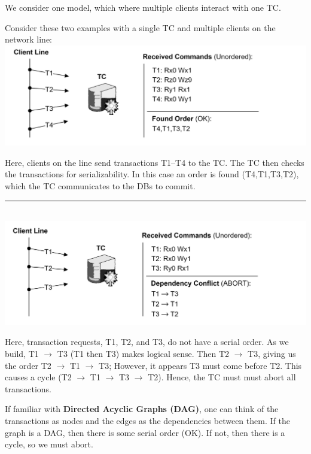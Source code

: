     \newpage 

    \noindent
    We consider one model, which where multiple clients interact with one TC.
    \begin{Example}

        Consider these two examples with a single TC and multiple clients on the network line:\\

       \noindent
        \includegraphics[width=\textwidth]{Sections/trans/central_1.png}
           
        \noindent
        Here, clients on the line send transactions T1--T4 to the TC. The TC then checks the transactions for serializability.
        In this case an order is found (T4,T1,T3,T2), which the TC communicates to the DBs to commit.\\

        \noindent
        \rule{\textwidth}{0.4pt}\\

        \noindent
        \includegraphics[width=\textwidth]{Sections/trans/central_2.png}

        \noindent
        Here, transaction requests, T1, T2, and T3, do not have a serial order.
        As we build, T1 $\to$ T3 (T1 then T3) makes logical sense. Then T2 $\to$ T3, giving us the order T2 $\to$ T1 $\to$ T3;
        However, it appears T3 must come before T2. This causes a cycle (T2 $\to$ T1 $\to$ T3 $\to$ T2).
        Hence, the TC must must abort all transactions.
    \end{Example}

    \begin{Tip}
    If familiar with \textbf{Directed Acyclic Graphs (DAG)}, one can think of the transactions as nodes and the edges as the dependencies between them.
    If the graph is a DAG, then there is some serial order (OK). If not, then there is a cycle, so we must abort.
    \end{Tip}

